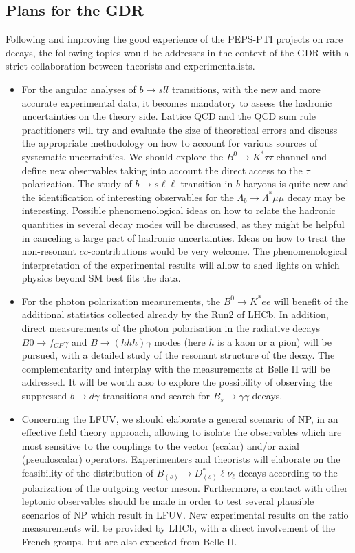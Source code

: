 \subsection*{Plans for the GDR}
 Following and improving  the good experience of the PEPS-PTI projects on rare decays, the following topics would be addresses in the context of  the GDR with a strict collaboration between theorists and experimentalists.
\begin{itemize}
\item For the angular analyses of $b \to sll$ transitions, with the new and more accurate experimental data, it becomes mandatory to assess the hadronic uncertainties on the theory side. Lattice QCD and the QCD sum rule practitioners will try and 
evaluate the size of theoretical errors and discuss the appropriate methodology on how to account for various sources of systematic uncertainties. We should explore the  $B^0\to K^\ast \tau\tau$ channel and define new observables taking into account the direct access to the $\tau$ polarization. The study of $b \to s \ell \ell$ transition in $b$-baryons  is quite new and the identification of interesting observables for the $\Lambda_b \to \Lambda^\ast \mu\mu$ decay may be interesting.  
Possible phenomenological ideas on how to relate the hadronic quantities in several decay modes will be discussed, as they might be helpful in canceling a large part of hadronic uncertainties.
Ideas on how to treat the non-resonant $c\bar c$-contributions would be very welcome. The phenomenological interpretation of the experimental results will allow to shed lights on which physics beyond SM best fits the data. 
\item For the photon polarization measurements, the $B^0\to K^\ast e e $ will benefit of the additional statistics collected already by the Run2 of LHCb. In addition,  direct measurements of the photon polarisation in  the radiative decays 
$B0 \to f_{CP}\gamma$ and $B \to(hhh)\gamma$ modes (here $h$ is a kaon or a pion) will be pursued, with a detailed study of the resonant structure of the decay. The complementarity and interplay with the measurements at Belle II will be addressed. It will be worth also to explore the possibility of observing the suppressed $b\to d\gamma$ transitions and search for $B_s\to \gamma \gamma$ decays. 
\item Concerning the LFUV, we should elaborate a general scenario of NP, in an effective field theory approach, allowing to isolate the  observables  which are most sensitive to the couplings to the vector (scalar) and/or axial (pseudoscalar) operators. Experimenters and theorists will elaborate on the feasibility of the distribution of $B_{(s)}\to D_{(s)}^\ast  \ell \nu_\ell$ decays according to the polarization of the outgoing vector meson. Furthermore, a contact with other leptonic observables should be made in order to test several plausible scenarios of NP which result in LFUV. New experimental results on the ratio measurements will be provided by LHCb, with a direct involvement of the French groups, but are also expected from Belle II. 

\end{itemize}

